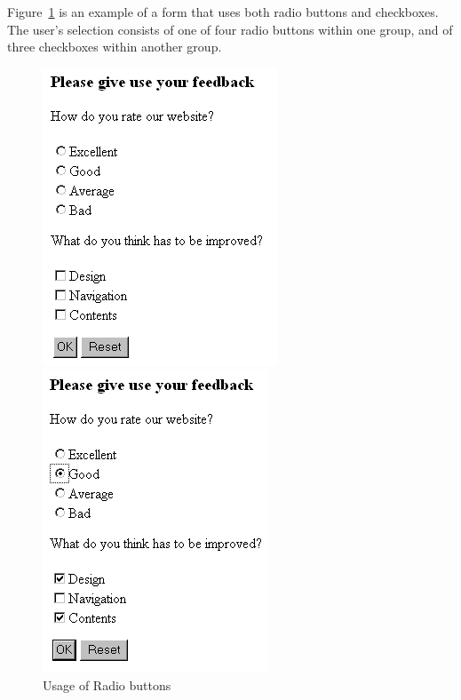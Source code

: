 Figure~\ref{Feedback} is an example of a form that uses both 
radio buttons and checkboxes.
The user's selection consists of one of four radio buttons within
one group, and of three checkboxes within another group.

\begin{figure}[t]

\begin{minipage}[b]{0.49\linewidth}
\begin{center}
\includegraphics[clip,width=0.5\linewidth]{pics/modules/44}
\end{center}
\end{minipage}
\hfill
\begin{minipage}[b]{0.49\linewidth}
\begin{center}
\includegraphics[clip,width=0.5\linewidth]{pics/modules/45}
\end{center}
\end{minipage}

\caption[Usage of Radio buttons]{Usage of Radio buttons}
\label{Feedback}

\end{figure}

